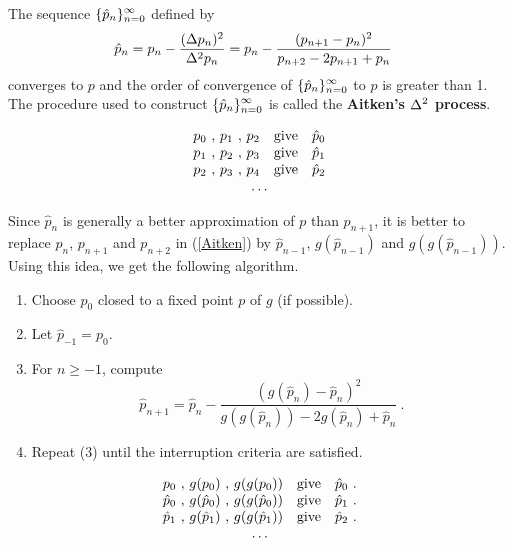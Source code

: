 The sequence $\displaystyle \{\hat{p}_n\}_{n=0}^\infty$ defined by
\begin{equation} \label{Aitken}
\begin{split}
\hat{p}_n &= p_n - \frac{(\Delta{p_n})^2}{\Delta^{2}{p_n}}
= p_n - \frac{(p_{n+1}- p_n)^2}{p_{n+2} -2p_{n+1} + p_n}
\end{split}
\end{equation}
converges to $p$ and the order of convergence of
$\displaystyle \{\hat{p}_n\}_{n=0}^\infty$ to $p$ is greater than 1.
The procedure used to construct $\displaystyle \{\hat{p}_n\}_{n=0}^\infty$ is
called the
{\bfseries Aitken's $\displaystyle \Delta^2$ process}.

\[
\begin{array}{l*{2}{@{\ ,\ }l}@{\quad\text{give}\quad}l}
p_0 & p_1 & p_2 & \hat{p}_0 \\
p_1 & p_2 & p_3 & \hat{p}_1 \\
p_2 & p_3 & p_4 & \hat{p}_2 \\
\multicolumn{4}{c}{\ldots}
\end{array}
\]

Since $\hat{p}_n$ is generally a better approximation of $p$ than
$p_{n+1}$, it is better to replace $p_n$, $p_{n+1}$ and $p_{n+2}$ in
(\ref{Aitken}) by $\hat{p}_{n-1}$, $g(\hat{p}_{n-1})$ and
$g(g(\hat{p}_{n-1}))$.  Using this idea, we get the following
algorithm.

\begin{algo}[Steffensen's]
\begin{enumerate}
\item Choose $p_0$ closed to a fixed point $p$ of $g$ (if possible).
\item Let $\hat{p}_{-1} = p_0$.
\item For $n \geq -1$, compute
\begin{equation} \label{formula4}
\hat{p}_{n+1} = \hat{p}_n - \frac{(g(\hat{p}_n) -
\hat{p}_n)^2}{g(g(\hat{p}_n)) -2 g(\hat{p}_n) + \hat{p}_n} \ .
\end{equation}
\item Repeat (3) until the interruption criteria are satisfied.
\end{enumerate}
\label{SteffAlgo}
\end{algo}

\[
\begin{array}{l*{2}{@{\ ,\ }l}@{\quad\text{give}\quad}l}
p_0 & g(p_0) & g(g(p_0)) & \hat{p}_0 \ . \\
\hat{p}_0 & g(\hat{p}_0) & g(g(\hat{p}_0)) & \hat{p}_1 \ . \\
\hat{p}_1 & g(\hat{p}_1) & g(g(\hat{p}_1)) & \hat{p}_2 \ . \\
\multicolumn{4}{c}{\ldots}
\end{array}
\]

